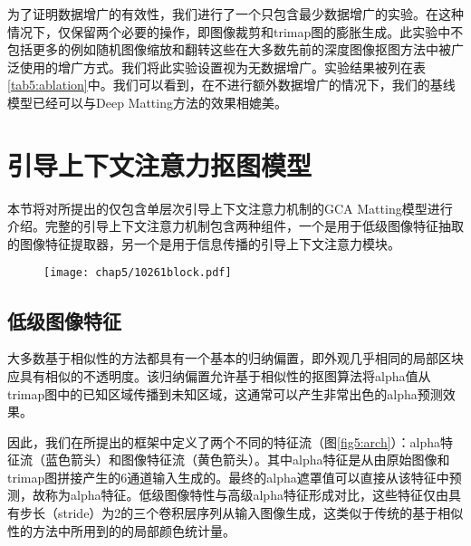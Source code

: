 为了证明数据增广的有效性，我们进行了一个只包含最少数据增广的实验。在这种情况下，仅保留两个必要的操作，即图像裁剪和trimap图的膨胀生成。此实验中不包括更多的例如随机图像缩放和翻转这些在大多数先前的深度图像抠图方法\cite{xu2017deep,lutz2018alphagan,samplenet,lu2019indices}中被广泛使用的增广方式。我们将此实验设置视为无数据增广。实验结果被列在表\ref{tab5:ablation}中。我们可以看到，在不进行额外数据增广的情况下，我们的基线模型已经可以与Deep Matting方法的效果相媲美。

\section{引导上下文注意力抠图模型}
本节将对所提出的仅包含单层次引导上下文注意力机制的GCA Matting模型进行介绍。完整的引导上下文注意力机制包含两种组件，一个是用于低级图像特征抽取的图像特征提取器，另一个是用于信息传播的引导上下文注意力模块。

\begin{figure}[t]
	\centering
	\texttt{[image: chap5/10261block.pdf]}
	\label{fig5:gca}
\end{figure}

\subsection{低级图像特征}

大多数基于相似性的方法都具有一个基本的归纳偏置，即外观几乎相同的局部区块应具有相似的不透明度。该归纳偏置允许基于相似性的抠图算法将alpha值从trimap图中的已知区域传播到未知区域，这通常可以产生非常出色的alpha预测效果。

因此，我们在所提出的框架中定义了两个不同的特征流（图\ref{fig5:arch}）：alpha特征流（蓝色箭头）和图像特征流（黄色箭头）。其中alpha特征是从由原始图像和trimap图拼接产生的6通道输入生成的。最终的alpha遮罩值可以直接从该特征中预测，故称为alpha特征。低级图像特性与高级alpha特征形成对比，这些特征仅由具有步长（stride）为2的三个卷积层序列从输入图像生成，这类似于传统的基于相似性的方法中所用到的的局部颜色统计量。

